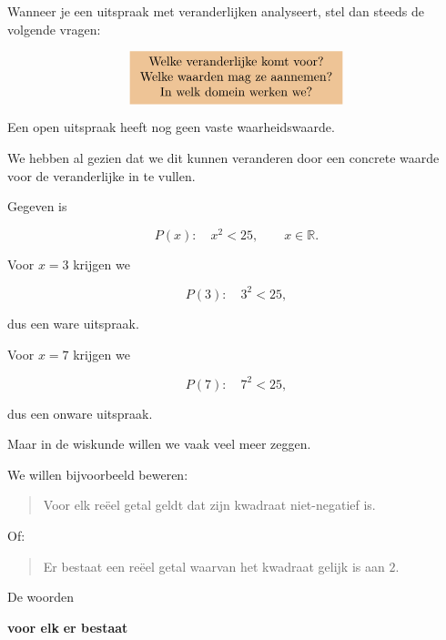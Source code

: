 \documentclass{ximera}
\begin{document}
\begin{opmerking}
Wanneer je een uitspraak met veranderlijken analyseert, stel dan steeds
de volgende vragen:

\[
\important{
\begin{array}{c}
\text{Welke veranderlijke komt voor?}\\
\text{Welke waarden mag ze aannemen?}\\
\text{In welk domein werken we?}
\end{array}
}
\]
\end{opmerking}



Een open uitspraak heeft nog geen vaste waarheidswaarde.

We hebben al gezien dat we dit kunnen veranderen door een concrete
waarde voor de veranderlijke in te vullen.


\begin{voorbeeld}

Gegeven is

\[
P(x):\quad x^2<25,
\qquad x\in\mathbb{R}.
\]

Voor $x=3$ krijgen we

\[
P(3):\quad 3^2<25,
\]

dus een ware uitspraak.

Voor $x=7$ krijgen we

\[
P(7):\quad 7^2<25,
\]

dus een onware uitspraak.
\end{voorbeeld}


Maar in de wiskunde willen we vaak veel meer zeggen.

We willen bijvoorbeeld beweren:

\begin{quote}
Voor elk reëel getal geldt dat zijn kwadraat niet-negatief is.
\end{quote}

Of:

\begin{quote}
Er bestaat een reëel getal waarvan het kwadraat gelijk is aan $2$.
\end{quote}

De woorden

\begin{center}
\textbf{voor elk}
\qquad{}\qquad
\textbf{er bestaat}
\end{center}
\end{document}
